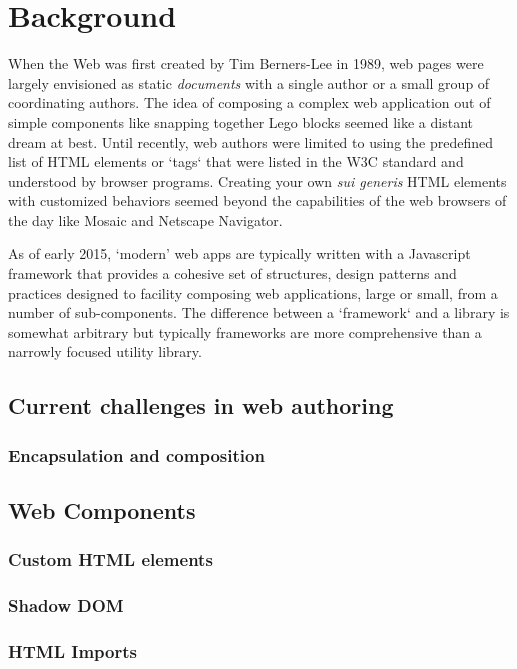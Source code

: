 \chapter{Background}
%

When the Web was first created by Tim Berners-Lee in 1989, web pages were largely envisioned as static \textit{documents} with a single author or a small group of coordinating authors. 
The idea of composing a complex web application out of simple components like snapping together Lego blocks seemed like a distant dream at best.
Until recently, web authors were limited to using the predefined list of HTML elements or `tags` that were listed in the W3C standard and understood by browser programs. 
Creating your own \textit{sui generis} HTML elements with customized behaviors seemed beyond the capabilities of the web browsers of the day like Mosaic and Netscape Navigator.

As of early 2015, `modern' web apps are typically written with a Javascript framework that provides a cohesive set of structures, design patterns and practices designed to facility composing web applications, large or small, from a number of sub-components.
The difference between a `framework` and a library is somewhat arbitrary but typically frameworks are more comprehensive than a narrowly focused utility library.

\section{Current challenges in web authoring}
\subsection{Encapsulation and composition}

\section{Web Components}
\subsection{Custom HTML elements}
\subsection{Shadow DOM}
\subsection{HTML Imports}
